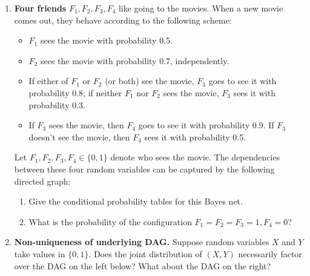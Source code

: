 \documentclass{article}
\begin{document}
\begin{enumerate} %
\addtocounter{enumi}{5} %

\item \textbf{Four friends} $F_1, F_2, F_3, F_4$ like going to the movies. When a new movie comes out, they behave according to the following scheme:
    \begin{itemize}
    \item $F_1$ sees the movie with probability 0.5.
    \item $F_2$ sees the movie with probability 0.7, independently.
    \item If either of $F_1$ or $F_2$ (or both) see the movie, $F_3$ goes to see it with probability 0.8; if neither $F_1$ nor $F_2$ sees the movie, $F_3$ sees it with probability 0.3.
    \item If $F_3$ sees the movie, then $F_4$ goes to see it with probability 0.9. If $F_3$ doesn't see the movie, then $F_4$ sees it with probability 0.5.
    \end{itemize}

    Let $F_1, F_2, F_3, F_4 \in \{0,1\}$ denote who sees the movie. The dependencies between these four random variables can be captured by the following directed graph:

    \begin{center}
    \end{center}

    \begin{enumerate}
    \item Give the conditional probability tables for this Bayes net.
    \item What is the probability of the configuration $F_1 = F_2 = F_3 = 1, F_4 = 0$?
    \end{enumerate}

\item \textbf{Non-uniqueness of underlying DAG.} Suppose random variables $X$ and $Y$ take values in $\{0,1\}$. Does the joint distribution of $(X, Y)$ necessarily factor over the DAG on the left below? What about the DAG on the right?


\end{enumerate}
\end{document}
